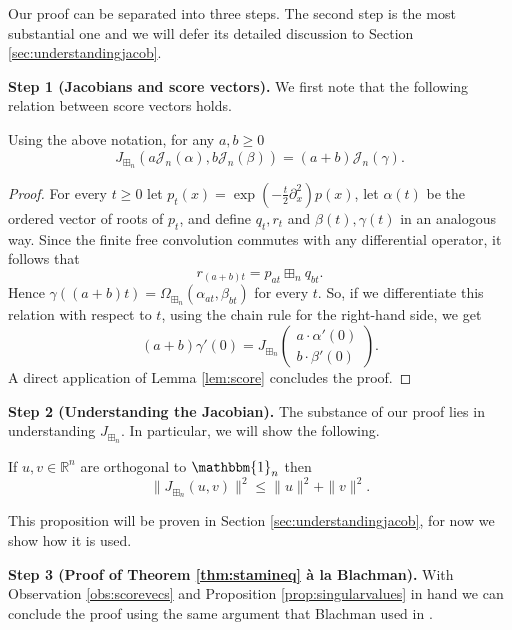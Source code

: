 \documentclass[12pt]{amsart}
\newcommand{\bR}{\mathbb{R}}
\newcommand{\bone}{\mathbbm{1}}
\newcommand{\jac}{J_{\boxplus_n}}
\newcommand{\roots}{\Omega_{\boxplus_n}}
\newcommand{\score}{\mathscr{J}_n}
\begin{document}
Our proof can be separated into three steps. The second step is  the most substantial one and we will defer its detailed discussion to Section \ref{sec:understandingjacob}. 

\textbf{Step 1 (Jacobians and score vectors).} We first note that the following relation between score vectors holds. 


\begin{observation}
\label{obs:scorevecs}
Using the above notation, for any $a, b \geq 0$ 
$$\jac (a\score(\alpha), b \score(\beta))  = (a+b)\score(\gamma). $$
\end{observation}

\begin{proof}
For every $t\geq 0$ let $p_t(x) = \exp(-\tfrac{t}{2} \partial_x^2) p(x)$, let $\alpha(t)$ be the ordered vector of roots of $p_t$, and define $q_t, r_t$ and $\beta(t), \gamma(t)$ in an analogous way. Since the finite free convolution commutes with any differential operator,  it follows that
      $$r_{(a+b)t} = p_{at} \boxplus_n q_{bt}. $$
    Hence  $\gamma((a+b)t) = \roots(\alpha_{at}, \beta_{bt})$ for every $t$. So, if we differentiate this  relation with respect to $t$, using the chain rule for the right-hand side,  we get
      $$(a+b)\gamma'(0) =  \jac \left(\begin{array}{c}
           a \cdot \alpha'(0)  \\ b \cdot\beta'(0)
      \end{array} \right).$$  
    A direct application of  Lemma \ref{lem:score} concludes the proof. 
\end{proof}


\textbf{Step 2 (Understanding the Jacobian).} The substance of our proof lies in understanding  $\jac$. In particular, we will show the following. 

\begin{proposition}
\label{prop:singularvalues}
  If $u, v \in \bR^n$ are orthogonal to $\bone_n$ then
    $$\|\jac (u, v)\|^2 \leq \|u\|^2 + \|v\|^2.$$
\end{proposition}

This proposition will be proven in Section \ref{sec:understandingjacob}, for now we show how it is used. 


\textbf{Step 3 (Proof of Theorem \ref{thm:stamineq} \`a la Blachman).} With Observation \ref{obs:scorevecs} and Proposition \ref{prop:singularvalues} in hand we can conclude the proof using the same argument that Blachman used in \cite{blachman2003convolution}. 
\end{document}
